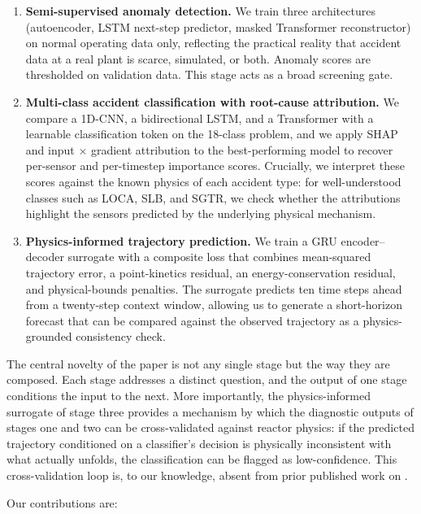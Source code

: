 \begin{enumerate}[leftmargin=*]
    \item \textbf{Semi-supervised anomaly detection.} We train three architectures (autoencoder, LSTM next-step predictor, masked Transformer reconstructor) on normal operating data only, reflecting the practical reality that accident data at a real plant is scarce, simulated, or both. Anomaly scores are thresholded on validation data. This stage acts as a broad screening gate.
    \item \textbf{Multi-class accident classification with root-cause attribution.} We compare a 1D-CNN, a bidirectional LSTM, and a Transformer with a learnable classification token on the 18-class problem, and we apply SHAP and input $\times$ gradient attribution to the best-performing model to recover per-sensor and per-timestep importance scores. Crucially, we interpret these scores against the known physics of each accident type: for well-understood classes such as LOCA, SLB, and SGTR, we check whether the attributions highlight the sensors predicted by the underlying physical mechanism.
    \item \textbf{Physics-informed trajectory prediction.} We train a GRU encoder--decoder surrogate with a composite loss that combines mean-squared trajectory error, a point-kinetics residual, an energy-conservation residual, and physical-bounds penalties. The surrogate predicts ten time steps ahead from a twenty-step context window, allowing us to generate a short-horizon forecast that can be compared against the observed trajectory as a physics-grounded consistency check.
\end{enumerate}

The central novelty of the paper is not any single stage but the way they are composed. Each stage addresses a distinct question, and the output of one stage conditions the input to the next. More importantly, the physics-informed surrogate of stage three provides a mechanism by which the diagnostic outputs of stages one and two can be cross-validated against reactor physics: if the predicted trajectory conditioned on a classifier's decision is physically inconsistent with what actually unfolds, the classification can be flagged as low-confidence. This cross-validation loop is, to our knowledge, absent from prior published work on \nppad{}.

Our contributions are:

